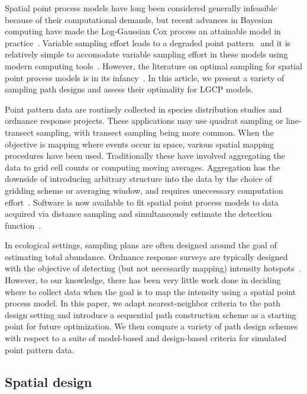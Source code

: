 \documentclass[review]{elsarticle}
\begin{document}
Spatial point process models have long been considered generally infeasible
because of their computational demands, but recent advances in Bayesian
computing have made the Log-Gaussian Cox process an attainable model in
practice~\citep{rueetal, lindgrenetal, illianetal, simpsonetal}. Variable
sampling effort leads to a degraded point pattern~\cite{chakrabortyetal} and
it is relatively simple to accomodate variable sampling effort in these models
using modern computing tools~\citep{yuanetal}. However, the literature on
optimal sampling for spatial point process models is in its
infancy~\citep{liuvanhatalo}. In this article, we present a variety of sampling
path designs and assess their optimality for LGCP models.

Point pattern data are routinely collected in species distribution studies and
ordnance response projects. These applications may use quadrat sampling or
line-transect sampling, with transect sampling being more common. When the
objective is mapping where events occur in space, various spatial mapping
procedures have been used. Traditionally these have involved aggregating the
data to grid cell counts or computing moving averages. Aggregation has the
downside of introducing arbitrary structure into the data by the choice of
gridding scheme or averaging window, and requires uneccessary computation
effort~\citep{simpsonetal}. Software is now available to fit spatial point
process models to data acquired via distance sampling and simultaneously
estimate the detection function~\citep{dspat,baser}.

In ecological settings, sampling plans are often designed around the goal of
estimating total abundance. Ordnance response surveys are typically designed
with the objective of detecting (but not necessarily mapping) intensity
hotspots~\citep{em200-1-15,flaggetal}. However, to our knowledge, there has
been very little work done in deciding where to collect data when the goal is
to map the intensity using a spatial point process model. In this paper, we
adapt nearest-neighbor criteria to the path design setting and introduce a
sequential path construction scheme as a starting point for future
optimization. We then compare a variety of path design schemes with respect
to a suite of model-based and design-based criteria for simulated point
pattern data.


\subsection{Spatial design}
\end{document}
